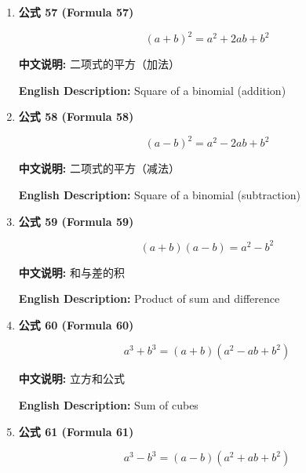 \documentclass[12pt,a4paper]{article}
\begin{document}
\begin{enumerate}[leftmargin=*]
\vspace{0.5cm}

\item \textbf{公式 57 (Formula 57)}

\begin{equation}
(a+b)^2 = a^2 + 2ab + b^2
\end{equation}

\textbf{中文说明:} 二项式的平方（加法）

\textbf{English Description:} Square of a binomial (addition)

\vspace{0.5cm}

\item \textbf{公式 58 (Formula 58)}

\begin{equation}
(a-b)^2 = a^2 - 2ab + b^2
\end{equation}

\textbf{中文说明:} 二项式的平方（减法）

\textbf{English Description:} Square of a binomial (subtraction)

\vspace{0.5cm}

\item \textbf{公式 59 (Formula 59)}

\begin{equation}
(a+b)(a-b) = a^2 - b^2
\end{equation}

\textbf{中文说明:} 和与差的积

\textbf{English Description:} Product of sum and difference

\vspace{0.5cm}

\item \textbf{公式 60 (Formula 60)}

\begin{equation}
a^3 + b^3 = (a + b)(a^2 - ab + b^2)
\end{equation}

\textbf{中文说明:} 立方和公式

\textbf{English Description:} Sum of cubes

\vspace{0.5cm}

\item \textbf{公式 61 (Formula 61)}

\begin{equation}
a^3 - b^3 = (a - b)(a^2 + ab + b^2)
\end{equation}


\end{enumerate}
\end{document}
